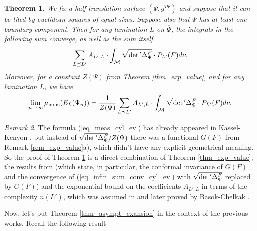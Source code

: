 \documentclass[12pt]{article}
\numberwithin{equation}{section}
\theoremstyle{theorem}
\newtheorem{thm}{Theorem}[section]
\theoremstyle{definition}
\theoremstyle{remark}
\newtheorem{rem}[thm]{Remark}
\newcommand{\laplcomp}{\Delta}
\begin{document}
	\begin{thm}\label{thm_meas_cyl_ev}
		We fix a half-translation surface $(\Psi, g^{T\Psi})$ and suppose that it can be tiled by euclidean squares of equal sizes.
		Suppose also that $\Psi$ has at least one boundary component.
		Then for any lamination $L$ on $\overline{\Psi}$, the integrals in the following sum converge, as well as the sum itself
		\begin{equation}\label{eq_infin_sum_conv_cyl_ev}
			\sum_{L \preceq L'} A_{L', L} \cdot \int_{\mathcal{M}} \sqrt{\smash[b]{\det{}' \laplcomp_{\Psi}^{F}}}
			 \cdot P_{L'}(F) d \nu.
		\end{equation}
		Moreover, for a constant $Z(\Psi)$ from Theorem \ref{thm_exp_value}, and for any lamination $L$, we have
		\begin{equation}\label{eq_meas_cyl_ev}
			\lim_{n \to \infty} \mu_{\rm{nonc}}(E_L(\Psi_n)) = \frac{1}{Z(\Psi)} \sum_{L \preceq L'} A_{L', L} \cdot \int_{\mathcal{M}}  \sqrt{\smash[b]{\det{}' \laplcomp_{\Psi}^{F}}} \cdot P_{L'}(F) d \nu.
		\end{equation}
	\end{thm}
	\begin{rem}\label{rem_meas_cyl_ev}
		The formula (\ref{eq_meas_cyl_ev}) has already appeared in Kassel-Kenyon \cite[Lemma 16, proof of Theorem 18 and end of \S 4.1]{KassKenyon}, but instead of $\sqrt{\smash[b]{\det{}' \laplcomp_{\Psi}^{F}}} / Z(\Psi)$ there was a functional $G(F)$  from Remark \ref{rem_exp_value}a), which didn't have any explicit geometrical meaning. So the proof of Theorem \ref{thm_meas_cyl_ev} is a direct combination of Theorem \ref{thm_exp_value}, the results from \cite{KassKenyon} (which state, in particular, the conformal invariance of $G(F)$ and the convergence of (\ref{eq_infin_sum_conv_cyl_ev}) with $\sqrt{\smash[b]{\det{}' \laplcomp_{\Psi}^{F}}}$ replaced by $G(F)$) and the exponential bound on the coefficients $A_{L', L}$ in terms of the complexity $n(L')$, which was assumed in \cite{KassKenyon} and later proved by Basok-Chelkak \cite[Theorem 4.9]{BasokChelk}.
	\end{rem}
	\par 
	Now, let's put Theorem \ref{thm_asympt_exansion} in the context of the previous works. 
	Recall the following result
\end{document}
